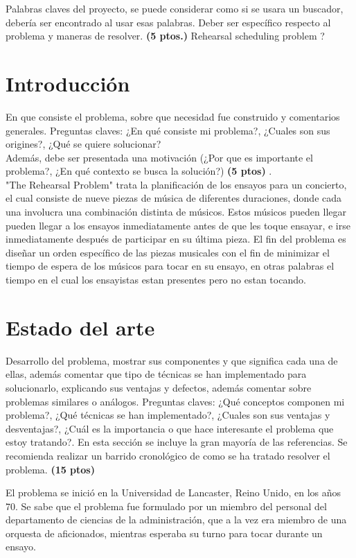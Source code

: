 \documentclass[journal, 10pt]{IEEEtran}
\begin{document}
\begin{IEEEkeywords}
Palabras claves del proyecto, se puede considerar como si se usara un buscador, debería ser encontrado al usar esas palabras. Deber ser específico respecto al problema y maneras de resolver. \textbf{(5 ptos.)} Rehearsal scheduling problem ?
\end{IEEEkeywords}

\section{Introducción}
En que consiste el problema, sobre que necesidad fue construido y comentarios generales. Preguntas claves: ¿En qué consiste mi problema?, ¿Cuales son sus origines?, ¿Qué se quiere solucionar?\\
Además, debe ser presentada una motivación (¿Por que es importante el problema?, ¿En qué contexto se busca la solución?) \textbf{(5 ptos)} .\\ "The Rehearsal Problem" trata la planificación de los ensayos para un concierto, el cual consiste de nueve piezas de música de diferentes duraciones, donde cada una involucra una combinación distinta de músicos. Estos músicos pueden llegar pueden llegar a los ensayos inmediatamente antes de que les toque ensayar, e irse inmediatamente después de participar en su última pieza. El fin del problema es diseñar un orden específico de las piezas musicales con el fin de minimizar el tiempo de espera de los músicos para tocar en su ensayo, en otras palabras el tiempo en el cual los ensayistas estan presentes pero no estan tocando. 

\section{Estado del arte}
Desarrollo del problema, mostrar sus componentes y que significa cada una de ellas, además comentar que tipo de técnicas se han implementado para solucionarlo, explicando sus ventajas y defectos, además comentar sobre problemas similares o análogos. Preguntas claves: ¿Qué conceptos componen mi problema?, ¿Qué técnicas se han implementado?, ¿Cuales son sus ventajas y desventajas?, ¿Cuál es la importancia o que hace interesante el problema que estoy tratando?. En esta sección se incluye la gran mayoría de las referencias. Se recomienda realizar un barrido cronológico de como se ha tratado resolver el problema. \textbf{(15 ptos)}

El problema se inició en la Universidad de Lancaster, Reino Unido, en los años 70. Se sabe que el problema fue formulado por un miembro del personal del departamento de ciencias de la administración, que a la vez era miembro de una orquesta de aficionados, mientras esperaba su turno para tocar durante un ensayo.
\end{document}
